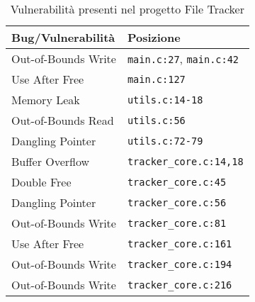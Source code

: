 \begin{table}[htbp]
  \centering
  \begin{tabular}{|l|l|} %
    \hline
    \textbf{Bug/Vulnerabilità} & \textbf{Posizione}                     \\ %
    \hline
    Out-of-Bounds Write        & \texttt{main.c:27}, \texttt{main.c:42} \\ %
    \hline
    Use After Free             & \texttt{main.c:127}                    \\ %
    \hline
    Memory Leak                & \texttt{utils.c:14-18}                 \\ %
    \hline
    Out-of-Bounds Read         & \texttt{utils.c:56}                    \\ %
    \hline
    Dangling Pointer           & \texttt{utils.c:72-79}                 \\ %
    \hline
    Buffer Overflow            & \texttt{tracker\_core.c:14,18}         \\ %
    \hline
    Double Free                & \texttt{tracker\_core.c:45}            \\ %
    \hline
    Dangling Pointer           & \texttt{tracker\_core.c:56}            \\ %
    \hline
    Out-of-Bounds Write        & \texttt{tracker\_core.c:81}            \\ %
    \hline
    Use After Free             & \texttt{tracker\_core.c:161}           \\ %
    \hline
    Out-of-Bounds Write        & \texttt{tracker\_core.c:194}           \\ %
    \hline
    Out-of-Bounds Write        & \texttt{tracker\_core.c:216}           \\ %
    \hline
  \end{tabular}
  \caption{Vulnerabilità presenti nel progetto File Tracker}
  \label{tab:tracker_vulnerabilities}
\end{table}

